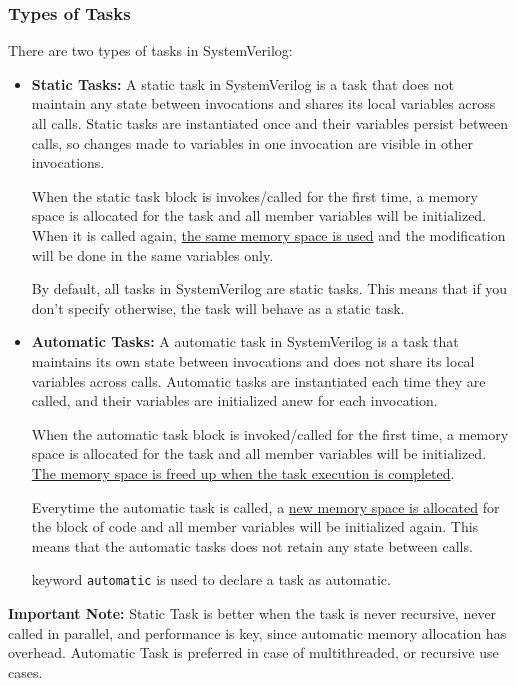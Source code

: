\documentclass[12pt, a4paper]{article}
\begin{document}
\subsubsection{Types of Tasks}

There are two types of tasks in SystemVerilog:
\begin{itemize}
    \item \textbf{Static Tasks:}
A static task in SystemVerilog is a task that does not maintain any state between invocations and shares its local variables across all calls. Static tasks are instantiated
once and their variables persist between calls, so changes made to variables in one invocation are visible in other invocations.

When the static task block is invokes/called for the first time, a memory space is allocated for the task and all member variables will be initialized. When it is called again, \ul{the same memory space is used} and the modification will be done in the same variables only.

By default, all tasks in SystemVerilog are static tasks. This means that if you don't specify otherwise, the task will behave as a static task.

\vspace{0.5em}
    \item \textbf{Automatic Tasks:}
A automatic task in SystemVerilog is a task that maintains its own state between invocations and does not share its local variables across calls. Automatic tasks are instantiated each time they are called, and their variables are initialized anew for each invocation.

When the automatic task block is invoked/called for the first time, a memory space is allocated for the task and all member variables will be initialized. \ul{The memory space is freed up when the task execution is completed}.

Everytime the automatic task is called, a \ul{new memory space is allocated} for the block of code and all member variables will be initialized again. This means that the automatic tasks does not retain any state between calls.

keyword \texttt{automatic} is used to declare a task as automatic.
\end{itemize}

\textbf{Important Note:} Static Task is better when the task is never recursive, never called in parallel, and performance is key, since automatic memory allocation has overhead. 
Automatic Task is preferred in case of multithreaded, or recursive use cases.
\end{document}
